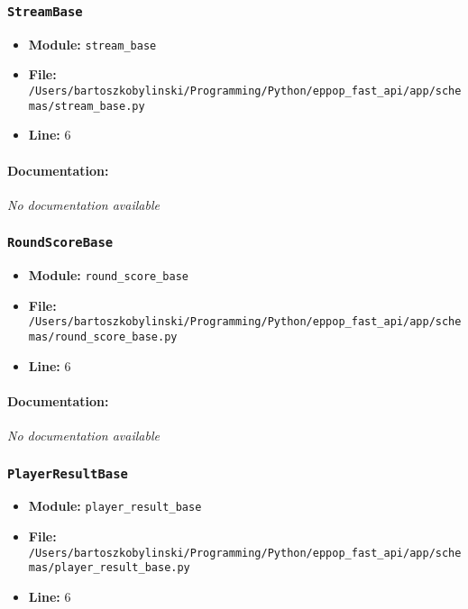 \documentclass[11pt,a4paper]{article}
\begin{document}
\vspace{1em}
\subsubsection{\texttt{StreamBase}}

\begin{itemize}
    \item \textbf{Module:} \texttt{stream\_base}
    \item \textbf{File:} \texttt{/Users/bartoszkobylinski/Programming/Python/eppop\_fast\_api/app/schemas/stream\_base.py}
    \item \textbf{Line:} 6
\end{itemize}

\paragraph{Documentation:} \textit{No documentation available}


\vspace{1em}
\subsubsection{\texttt{RoundScoreBase}}

\begin{itemize}
    \item \textbf{Module:} \texttt{round\_score\_base}
    \item \textbf{File:} \texttt{/Users/bartoszkobylinski/Programming/Python/eppop\_fast\_api/app/schemas/round\_score\_base.py}
    \item \textbf{Line:} 6
\end{itemize}

\paragraph{Documentation:} \textit{No documentation available}


\vspace{1em}
\subsubsection{\texttt{PlayerResultBase}}

\begin{itemize}
    \item \textbf{Module:} \texttt{player\_result\_base}
    \item \textbf{File:} \texttt{/Users/bartoszkobylinski/Programming/Python/eppop\_fast\_api/app/schemas/player\_result\_base.py}
    \item \textbf{Line:} 6
\end{itemize}
\end{document}
